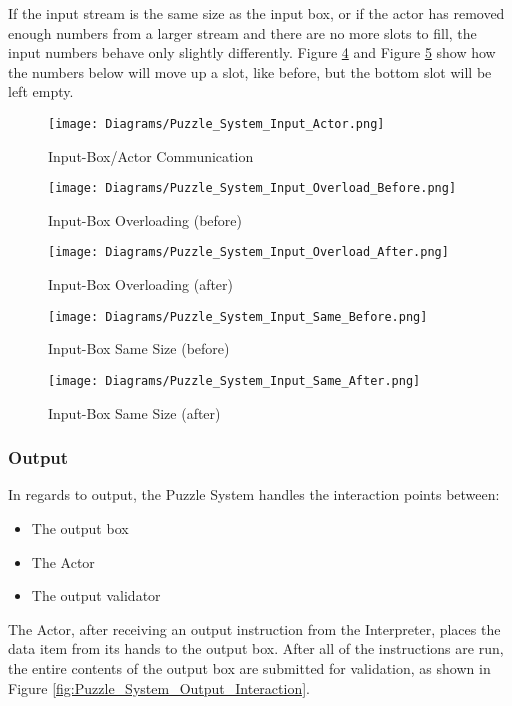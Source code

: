 If the input stream is the same size as the input box, or if the actor has removed
enough numbers from a larger stream and there are no more slots to fill, the input numbers
behave only slightly differently. Figure \ref{fig:Puzzle_System_Input_Same_Before}
and Figure \ref{fig:Puzzle_System_Input_Same_After} show how the numbers below will move up a slot, like before,
but the bottom slot will be left empty.\\

\begin{figure}[!hb]
  \caption{Input-Box/Actor Communication}
  \label{fig:Puzzle_System_Input_Actor}
  \centering
  \texttt{[image: Diagrams/Puzzle\_System\_Input\_Actor.png]}
\end{figure}

\begin{figure}[!hb]
  \caption{Input-Box Overloading (before)}
  \label{fig:Puzzle_System_Input_Overload_Before}
  \centering
  \texttt{[image: Diagrams/Puzzle\_System\_Input\_Overload\_Before.png]}
\end{figure}

\begin{figure}[!hb]
  \caption{Input-Box Overloading (after)}
  \label{fig:Puzzle_System_Input_Overload_After}
  \centering
  \texttt{[image: Diagrams/Puzzle\_System\_Input\_Overload\_After.png]}
\end{figure}
\vfill
\clearpage

\begin{figure}[!hb]
  \caption{Input-Box Same Size (before)}
  \label{fig:Puzzle_System_Input_Same_Before}
  \centering
  \texttt{[image: Diagrams/Puzzle\_System\_Input\_Same\_Before.png]}
\end{figure}

\begin{figure}[!hb]
  \caption{Input-Box Same Size (after)}
  \label{fig:Puzzle_System_Input_Same_After}
  \centering
  \texttt{[image: Diagrams/Puzzle\_System\_Input\_Same\_After.png]}
\end{figure}
\vfill
\clearpage

\subsubsection{Output}
In regards to output, the Puzzle System handles the interaction points between:
\begin{itemize}
  \item The output box
  \item The Actor
  \item The output validator
\end{itemize}
The Actor, after receiving an output instruction from the Interpreter, places the
data item from its hands to the output box. After all of the instructions are run, the
entire contents of the output box are submitted for validation, as shown in Figure
\ref{fig:Puzzle_System_Output_Interaction}.\\

